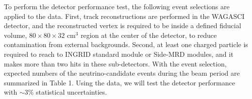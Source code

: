 To perform the detector performance test, the following event selections are applied to the data. 
First, track reconstructions are performed in the WAGASCI detector, and the reconstructed vertex is required to be inside a defined fiducial volume, $80 \times80 \times 32$ cm$^{3}$ region at the center of the detector, to reduce contamination from external backgrounds. 
Second, at least one charged particle is required to reach to INGRID standard module or Side-MRD modules, and it makes more than two hits in these sub-detectors. 
With the event selection, expected numbers of the neutrino-candidate events during the beam period are summarized in Table 1. 
Using the data, we will test the detector performance with $\sim3$\% statistical uncertainties.

